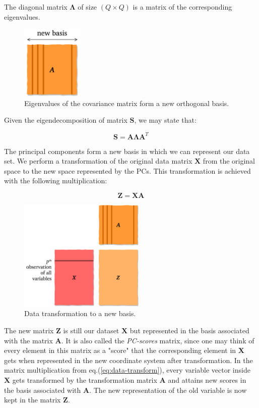 \documentclass[10pt,twocolumn]{article}
\begin{document}
The diagonal matrix $\bm{\Lambda}$ of size $(Q \times Q)$ is a matrix of the corresponding eigenvalues.

\begin{figure}[H]
\centering\includegraphics[width=3cm]{new-basis.png}
\caption{Eigenvalues of the covariance matrix form a new orthogonal basis.}
\label{fig:new-basis}
\end{figure}

Given the eigendecomposition of matrix $\bm{S}$, we may state that: 

\begin{equation} \label{eq:eig-dec-cov-matrix}
\bm{S} = \bm{A} \bm{\Lambda} \bm{A}^T
\end{equation}

The principal components form a new basis in which we can represent our data set. We perform a transformation of the original data matrix $\bm{X}$ from the original space to the new space represented by the PCs. This transformation is achieved with the following multiplication:

\begin{equation} \label{eq:data-transform}
\bm{Z} = \bm{X} \bm{A}
\end{equation}

\begin{figure}[H]
\centering\includegraphics[width=6cm]{data-transformation.png}
\caption{Data transformation to a new basis.}
\label{fig:data-transformation}
\end{figure}

The new matrix $\bm{Z}$ is still our dataset $\bm{X}$ but represented in the basis associated with the matrix $\bm{A}$. It is also called the \textit{PC-scores} matrix, since one may think of every element in this matrix as a "score" that the corresponding element in $\bm{X}$ gets when represented in the new coordinate system after transformation. In the matrix multiplication from eq.(\ref{eq:data-transform}), every variable vector inside $\bm{X}$ gets transformed by the transformation matrix $\bm{A}$ and attains new scores in the basis associated with $\bm{A}$. The new representation of the old variable is now kept in the matrix $\bm{Z}$.
\end{document}
